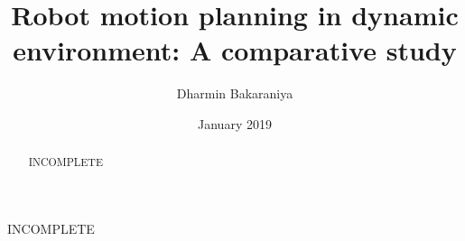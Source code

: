 \documentclass[thesis]{mas_report}
\author{Dharmin Bakaraniya}
\title{Robot motion planning in dynamic environment: A comparative study}
\date{January 2019}
\begin{document}
\begin{titlepage}
    \maketitle
\end{titlepage}


\pagestyle{plain}


\cleardoublepage{}
\statementpage{}

\begin{abstract}
INCOMPLETE
\end{abstract}


\begin{acknowledgements}
INCOMPLETE
\end{acknowledgements}


\tableofcontents
\listoffigures
\listoftables


\mainmatter{} %

\pagestyle{mainmatter}











\begin{appendices}


\end{appendices}

\backmatter{}

\end{document}
